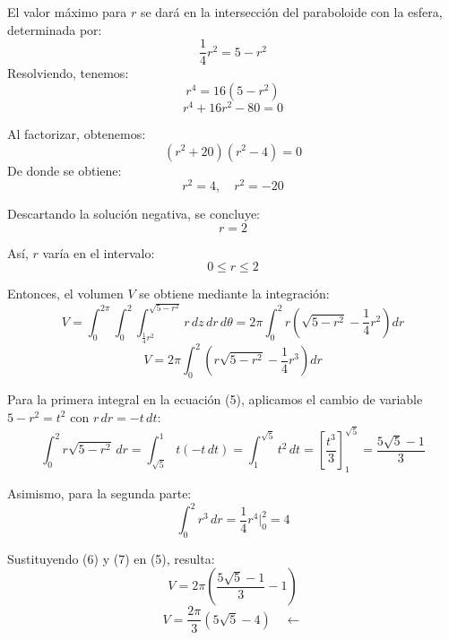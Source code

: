 \documentclass{report}
\begin{document}
El valor máximo para \(r\) se dará en la intersección del paraboloide con la esfera, determinada por:
\[
\frac{1}{4} r^2 = 5 - r^2
\]
Resolviendo, tenemos:
\[
r^4 = 16 (5 - r^2)
\]
\[
r^4 + 16r^2 - 80 = 0
\]

Al factorizar, obtenemos:
\[
(r^2 + 20)(r^2 - 4) = 0
\]
De donde se obtiene:
\[
r^2 = 4, \quad r^2 = -20
\]

Descartando la solución negativa, se concluye:
\[
r = 2 \tag{3}
\]

Así, \(r\) varía en el intervalo:
\[
0 \leq r \leq 2 \tag{4}
\]

Entonces, el volumen \(V\) se obtiene mediante la integración:
\[
V = \int_0^{2\pi} \int_0^2 \int_{\frac{1}{4} r^2}^{\sqrt{5 - r^2}} r \, dz \, dr \, d\theta = 2\pi \int_0^2 r \left( \sqrt{5 - r^2} - \frac{1}{4} r^2 \right) dr
\]
\[
V = 2\pi \int_0^2 \left( r \sqrt{5 - r^2} - \frac{1}{4} r^3 \right) dr \tag{5}
\]

Para la primera integral en la ecuación (5), aplicamos el cambio de variable \(5 - r^2 = t^2\) con \(r \, dr = -t \, dt\):
\[
\int_0^2 r \sqrt{5 - r^2} \, dr = \int_{\sqrt{5}}^1 t (-t \, dt) = \int_1^{\sqrt{5}} t^2 \, dt = \left[ \frac{t^3}{3} \right]_1^{\sqrt{5}} = \frac{5\sqrt{5} - 1}{3} \tag{6}
\]

Asimismo, para la segunda parte:
\[
\int_0^2 r^3 \, dr = \frac{1}{4} r^4 \Big|_0^2 = 4 \tag{7}
\]

Sustituyendo (6) y (7) en (5), resulta:
\[
V = 2\pi \left( \frac{5\sqrt{5} - 1}{3} - 1 \right)
\]
\[
V = \frac{2\pi}{3} \left( 5\sqrt{5} - 4 \right) \quad \boxed{\leftarrow}
\]
\end{document}
